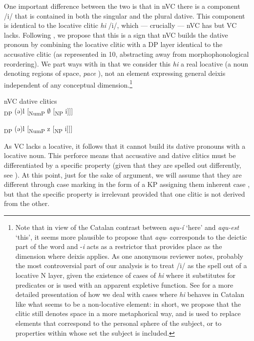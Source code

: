 \documentclass[output=paper,modfonts,nonflat,newtxmath,colorlinks,citecolor=brown]{langsci/langscibook}
\begin{document}
  
One important difference between the two is that in nVC there is a component /i/ that is contained in both the singular and the plural dative. This component is identical to the locative clitic \textit{hi} /i/, which — crucially — nVC has but VC lacks. Following \citet{Martin2012}, we propose that this is a sign that nVC builds the dative pronoun by combining the locative clitic with a DP layer identical to the accusative clitic (as represented in 10, abstracting away from morphophonological reordering). We part ways with \citet{Martin2012} in that we consider this \textit{hi} a real locative (a noun denoting regions of space, \textit{pace} \citealt{Rigau1978, Rigau1982}), not an element expressing general deixis independent of any conceptual dimension.\footnote{Note that in view of the Catalan contrast between \textit{aqu-í} ‘here’ and \textit{aqu-est} ‘this’, it seems more plausible to propose that \textit{aqu}{}- corresponds to the deictic part of the word and -\textit{i} acts as a restrictor that provides place as the dimension where deixis applies. As one anonymous reviewer notes, probably the most controversial part of our analysis is to treat /i/ as the spell out of a locative N layer, given the existence of cases of \textit{hi} where it substitutes for predicates or is used with an apparent expletive function. See \citet{CabréFábregas2019} for a more detailed presentation of how we deal with cases where \textit{hi} behaves in Catalan like what seems to be a non-locative element: in short, we propose that the clitic still denotes space in a more metaphorical way, and is used to replace elements that correspond to the personal sphere of the subject, or to properties within whose set the subject is included.} 

\ea%
 nVC dative clitics \\
    \label{ex:cabre:10}
    \ea {[}\textsubscript{DP}  (ǝ)l  [\textsubscript{NumP}  $\emptyset$  [\textsubscript{NP}  i{]]]}
    
    \ex  {[}\textsubscript{DP}  (ǝ)l  [\textsubscript{NumP}  z [\textsubscript{NP}  i]{]]}
    \z
    \z
  	 
  
    

As VC lacks a locative, it follows that it cannot build its dative pronouns with a locative noun. This perforce means that accusative and dative clitics must be differentiated by a specific property (given that they are spelled out differently, see ). At this point, just for the sake of argument, we will assume that they are different through case marking in the form of a KP assigning them inherent case , but that the specific property is irrelevant provided that one clitic is not derived from the other. 
\end{document}
